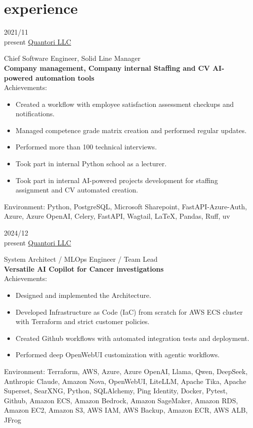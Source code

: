 \section{experience}

\begin{entrylist}
\entry
{2021/11\\present}
{\href{https://quantori.com}{Quantori LLC}}
{}
{Chief Software Engineer, Solid Line Manager\\
\textbf{Company management, Company internal Staffing and CV AI-powered automation tools}\\
Achievements:
\begin{itemize}
\item Created a workflow with employee satisfaction assessment checkups and notifications.
\item Managed competence grade matrix creation and performed regular updates.
\item Performed more than 100 technical interviews.
\item Took part in internal Python school as a lecturer.
\item Took part in internal AI-powered projects development for staffing assignment and CV automated creation.
\end{itemize}
Environment: Python, PostgreSQL, Microsoft Sharepoint, FastAPI-Azure-Auth, Azure, Azure OpenAI, Celery, FastAPI, Wagtail, LaTeX, Pandas, Ruff, uv}
\entry
{2024/12\\present}
{\href{https://quantori.com}{Quantori LLC}}
{}
{System Architect / MLOps Engineer / Team Lead\\
\textbf{Versatile AI Copilot for Cancer investigations}\\
Achievements:
\begin{itemize}
\item Designed and implemented the Architecture.
\item Developed Infrastructure as Code (IaC) from scratch for AWS ECS cluster with Terraform and strict customer policies.
\item Created Github workflows with automated integration tests and deployment.
\item Performed deep OpenWebUI customization with agentic workflows.
\end{itemize}
Environment: Terraform, AWS, Azure, Azure OpenAI, Llama, Qwen, DeepSeek, Anthropic Claude, Amazon Nova, OpenWebUI, LiteLLM, Apache Tika, Apache Superset, SearXNG, Python, SQLAlchemy, Ping Identity, Docker, Pytest, Github, Amazon ECS, Amazon Bedrock, Amazon SageMaker, Amazon RDS, Amazon EC2, Amazon S3, AWS IAM, AWS Backup, Amazon ECR, AWS ALB, JFrog}

\end{entrylist}

